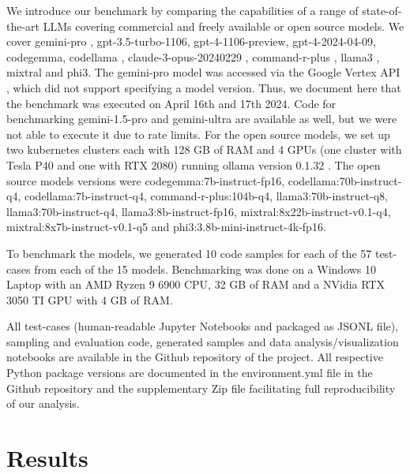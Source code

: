 \documentclass{ecai}
\begin{document}
We introduce our benchmark by comparing the capabilities of a range of state-of-the-art LLMs covering commercial and freely available or open source models. We cover gemini-pro \citep{geminiteam2024gemini}, gpt-3.5-turbo-1106, gpt-4-1106-preview, gpt-4-2024-04-09, codegemma, codellama \citep{roziere2024code}, claude-3-opus-20240229 \citep{anthropic2024claude}, command-r-plus \citep{command_r_plus}, llama3 \citep{llama3}, mixtral \citep{jiang2024mixtral} and phi3. The gemini-pro model was accessed via the Google Vertex API \citep{google2024vertex}, which did not support specifying a model version. Thus, we document here that the benchmark was executed on April 16th and 17th 2024. Code for benchmarking gemini-1.5-pro and gemini-ultra are available as well, but we were not able to execute it due to rate limits. For the open source models, we set up two kubernetes clusters each with 128 GB of RAM and 4 GPUs (one cluster with Tesla P40 and one with RTX 2080) running ollama version 0.1.32 \citep{ollama2024}. The open source models versions were codegemma:7b-instruct-fp16, codellama:70b-instruct-q4, codellama:7b-instruct-q4, command-r-plus:104b-q4, llama3:70b-instruct-q8, llama3:70b-instruct-q4, llama3:8b-instruct-fp16, mixtral:8x22b-instruct-v0.1-q4, mixtral:8x7b-instruct-v0.1-q5 and phi3:3.8b-mini-instruct-4k-fp16.

To benchmark the models, we generated 10 code samples for each of the 57 test-cases from each of the 15 models. Benchmarking was done on a Windows 10 Laptop with an AMD Ryzen 9 6900 CPU, 32 GB of RAM and a NVidia RTX 3050 TI GPU with 4 GB of RAM.

All test-cases (human-readable Jupyter Notebooks and packaged as JSONL file), sampling and evaluation code, generated samples and data analysis/visualization notebooks are available in the Github repository of the project. All respective Python package versions are documented in the environment.yml file in the Github repository and the supplementary Zip file facilitating full reproducibility of our analysis.





\section{Results}
\end{document}
